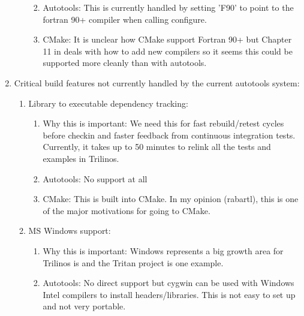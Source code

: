 \documentclass[pdf,ps2pdf,11pt]{SANDreport}
\begin{document}
\begin{enumerate}
\begin{enumerate}
\begin{enumerate}
    {}\item Autotools: This is currently handled by setting 'F90' to
    point to the fortran 90+ compiler when calling configure.

    {}\item CMake: It is unclear how CMake support Fortran 90+ but
    Chapter 11 in {}\cite{MasteringCMake_fourth} deals with how to add
    new compilers so it seems this could be supported more cleanly
    than with autotools.

    \end{enumerate}

  \end{enumerate}

{}\item Critical build features not currently handled by the current
autotools system:

  \begin{enumerate}

  {}\item Library to executable dependency tracking:

    \begin{enumerate}

    {}\item Why this is important: We need this for fast
    rebuild/retest cycles before checkin and faster feedback from
    continuous integration tests.  Currently, it takes up to 50
    minutes to relink all the tests and examples in Trilinos.

    {}\item Autotools: No support at all

    {}\item CMake: This is built into CMake.  In my opinion (rabartl),
    this is one of the major motivations for going to CMake.

    \end{enumerate}

  {}\item MS Windows support:

    \begin{enumerate}

    {}\item Why this is important: Windows represents a big growth
    area for Trilinos is and the Tritan project is one example.

    {}\item Autotools: No direct support but cygwin can be used with
    Windows Intel compilers to install headers/libraries.  This is not
    easy to set up and not very portable.


\end{enumerate}
\end{enumerate}
\end{enumerate}
\end{document}
